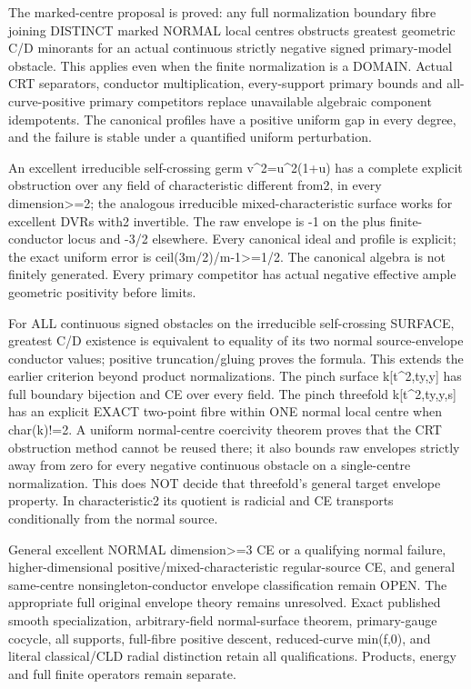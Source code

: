 \documentclass[11pt]{article}
\begin{document}
The marked-centre proposal is proved: any full normalization boundary fibre joining DISTINCT marked NORMAL local centres obstructs greatest geometric C/D minorants for an actual continuous strictly negative signed primary-model obstacle. This applies even when the finite normalization is a DOMAIN. Actual CRT separators, conductor multiplication, every-support primary bounds and all-curve-positive primary competitors replace unavailable algebraic component idempotents. The canonical profiles have a positive uniform gap in every degree, and the failure is stable under a quantified uniform perturbation.

An excellent irreducible self-crossing germ v\textasciicircum{}2=u\textasciicircum{}2(1+u) has a complete explicit obstruction over any field of characteristic different from2, in every dimension\textgreater{}=2; the analogous irreducible mixed-characteristic surface works for excellent DVRs with2 invertible. The raw envelope is -1 on the plus finite-conductor locus and -3/2 elsewhere. Every canonical ideal and profile is explicit; the exact uniform error is ceil(3m/2)/m-1\textgreater{}=1/2. The canonical algebra is not finitely generated. Every primary competitor has actual negative effective ample geometric positivity before limits.

For ALL continuous signed obstacles on the irreducible self-crossing SURFACE, greatest C/D existence is equivalent to equality of its two normal source-envelope conductor values; positive truncation/gluing proves the formula. This extends the earlier criterion beyond product normalizations. The pinch surface k[t\textasciicircum{}2,ty,y] has full boundary bijection and CE over every field. The pinch threefold k[t\textasciicircum{}2,ty,y,s] has an explicit EXACT two-point fibre within ONE normal local centre when char(k)!=2. A uniform normal-centre coercivity theorem proves that the CRT obstruction method cannot be reused there; it also bounds raw envelopes strictly away from zero for every negative continuous obstacle on a single-centre normalization. This does NOT decide that threefold's general target envelope property. In characteristic2 its quotient is radicial and CE transports conditionally from the normal source.

General excellent NORMAL dimension\textgreater{}=3 CE or a qualifying normal failure, higher-dimensional positive/mixed-characteristic regular-source CE, and general same-centre nonsingleton-conductor envelope classification remain OPEN. The appropriate full original envelope theory remains unresolved. Exact published smooth specialization, arbitrary-field normal-surface theorem, primary-gauge cocycle, all supports, full-fibre positive descent, reduced-curve min(f,0), and literal classical/CLD radial distinction retain all qualifications. Products, energy and full finite operators remain separate.
\end{document}
